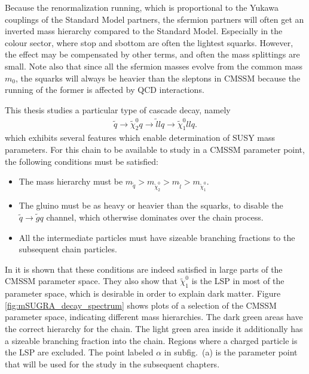 \documentclass[twoside,english]{uiofysmaster}
\begin{document}
Because the renormalization running, which is proportional to the Yukawa couplings of the Standard Model partners, the sfermion partners will often get an inverted mass hierarchy compared to the Standard Model. Especially in the colour sector, where stop and sbottom are often the lightest squarks. However, the effect may be compensated by other terms, and often the mass splittings are small. Note also that since all the sfermion masses evolve from the common mass $m_0$, the squarks will always be heavier than the sleptons in CMSSM because the running of the former is affected by QCD interactions. 

This thesis studies a particular type of cascade decay, namely
\begin{align}
	\tilde q \to \tilde\chi_2^0q \to \tilde l l q \to \tilde \chi_1^0 ll q.	\label{eq:susyintrochap_cascade}
\end{align}
which exhibits several features which enable determination of SUSY mass parameters. For this chain to be available to study in a CMSSM parameter point, the following conditions must be satisfied: 
\begin{itemize}
	\item The mass hierarchy must be $m_{\tilde q} > m_{\tilde\chi_2^0} > m_{\tilde l} > m_{\tilde\chi_1^0}$.
	\item The gluino must be as heavy or heavier than the squarks, to disable the $\tilde q \to \tilde g q$ channel, which otherwise dominates over the chain process.
	\item All the intermediate particles must have sizeable branching fractions to the subsequent chain particles.
\end{itemize}
In \cite{Gjelsten:2004ki} it is shown that these conditions are indeed satisfied in large parts of the CMSSM parameter space. They also show that $\tilde\chi_1^0$ is the LSP in most of the parameter space, which is desirable in order to explain dark matter. Figure \ref{fig:mSUGRA_decay_spectrum} shows plots of a selection of the CMSSM parameter space, indicating different mass hierarchies. The dark green areas have the correct hierarchy for the chain. The light green area inside it additionally has a sizeable branching fraction into the chain. Regions where a charged particle is the LSP are excluded. The point labeled $\alpha$ in subfig.\ (a) is the parameter point that will be used for the study in the subsequent chapters.
\end{document}

